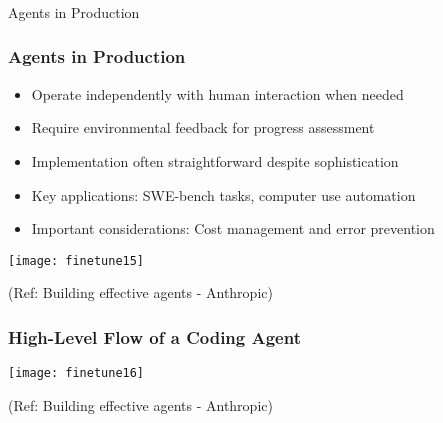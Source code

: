 \begin{frame}[fragile]\frametitle{}
\begin{center}
{\Large Agents in Production}
\end{center}
\end{frame}

\begin{frame}[fragile]\frametitle{Agents in Production}
\begin{itemize}
    \item Operate independently with human interaction when needed
    \item Require environmental feedback for progress assessment
    \item Implementation often straightforward despite sophistication
    \item Key applications: SWE-bench tasks, computer use automation
    \item Important considerations: Cost management and error prevention
\end{itemize}

\begin{center}
\texttt{[image: finetune15]}
\end{center}

{\tiny (Ref: Building effective agents - Anthropic)}
\end{frame}

\begin{frame}[fragile]\frametitle{High-Level Flow of a Coding Agent}
\begin{center}
\texttt{[image: finetune16]}
\end{center}

{\tiny (Ref: Building effective agents - Anthropic)}
\end{frame}

